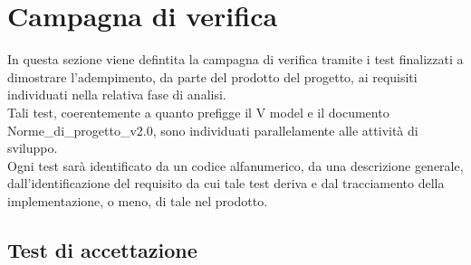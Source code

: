 \section{Campagna di verifica} \label{sec:test}
In questa sezione viene defintita la campagna di verifica tramite i test finalizzati a dimostrare l'adempimento, da parte del prodotto del progetto, ai requisiti individuati nella relativa fase di analisi.\\
Tali test, coerentemente a quanto prefigge il V model e il documento Norme\_di\_progetto\_v2.0, sono individuati parallelamente alle attività di sviluppo.\\
Ogni test sarà identificato da un codice alfanumerico, da una descrizione generale, dall'identificazione del requisito da cui tale test deriva e dal tracciamento della implementazione, o meno, di tale nel prodotto.

\subsection{Test di accettazione}

